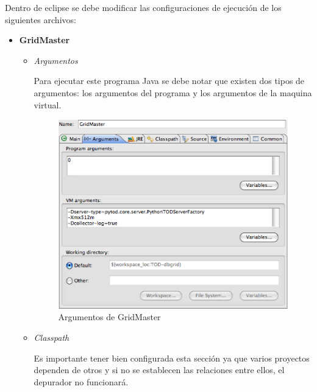 \documentclass[12pt,legalpaper]{report}
\begin{document}
Dentro de eclipse se debe modificar las configuraciones de ejecución de los siguientes archivos:

\begin{itemize}
	\item \textbf{GridMaster}
	\begin{itemize}
		\item \textit{Argumentos}

Para ejecutar este programa Java se debe notar que existen dos tipos de argumentos: los argumentos del programa y los argumentos de la maquina virtual.

\begin{figure}[h]
	\centering
	\includegraphics[scale=0.5]{images/aspectoFuncionamiento/argsGridMaster.eps}
	\caption{Argumentos de GridMaster}
\end{figure}		
		
		\item \textit{Classpath}
		
Es importante tener bien configurada esta sección ya que varios proyectos dependen de otros y si no se establecen las relaciones entre ellos, el depurador no funcionará.
		

\end{itemize}
\end{itemize}
\end{document}
